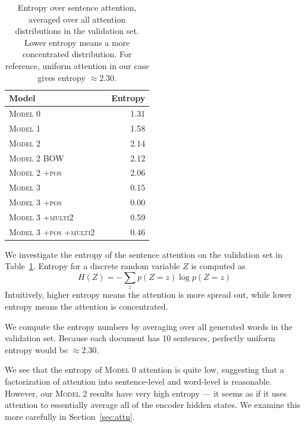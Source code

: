 \documentclass[12pt]{report}
\begin{document}
\begin{table}[t]
\centering
\begin{tabular}{llr}
\toprule
Model & & Entropy \\
\midrule
\textsc{Model 0} & & 1.31 \\
\textsc{Model 1} & & 1.58 \\
\textsc{Model 2} & & 2.14\\
\textsc{Model 2 BOW} & & 2.12 \\
\textsc{Model 2 +pos} & & 2.06 \\
\textsc{Model 3 } & & 0.15 \\
\textsc{Model 3 +pos} & & 0.00 \\
\textsc{Model 3  +multi2} & & 0.59 \\
\textsc{Model 3  +pos +multi2} & & 0.46 \\
\bottomrule
\end{tabular}
\caption[Sentence Attention Entropy]{Entropy over sentence attention, averaged over all attention distributions in the validation set. Lower entropy means a more concentrated distribution. For reference, uniform attention in our case gives entropy $\approx 2.30$.}
\label{table:entropy}
\end{table}

We investigate the entropy of the sentence attention on the validation set in Table~\ref{table:entropy}. Entropy for a discrete random variable $Z$ is computed as
$$H(Z) = -\sum_{z} p(Z = z) \log p(Z = z)$$
Intuitively, higher entropy means the attention is more spread out, while lower entropy means the attention is concentrated.

We compute the entropy numbers by averaging over all generated words in the validation set. Because each document has 10 sentences, perfectly uniform entropy would be $\approx 2.30$.

We see that the entropy of \textsc{Model 0} attention is quite low, suggesting that a factorization of attention into sentence-level and word-level is reasonable. However, our \textsc{Model 2} results have very high entropy --- it seems as if it uses attention to essentially average all of the encoder hidden states. We examine this more carefully in Section~\ref{sec:attn}.


\end{document}
